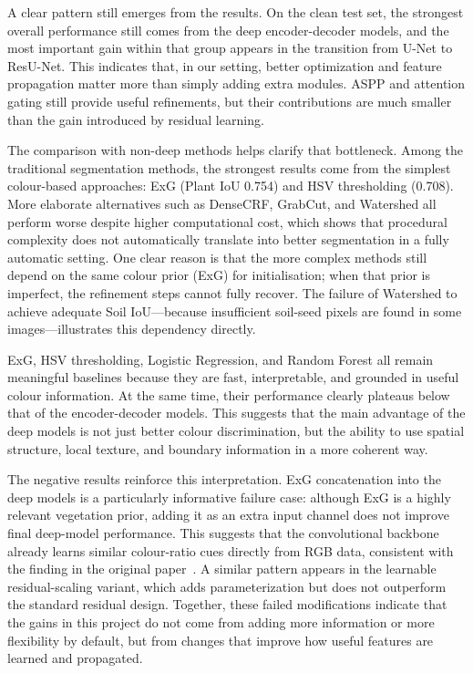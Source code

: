 \documentclass[conference]{IEEEtran}
\begin{document}
A clear pattern still emerges from the results. On the clean test set,
the strongest overall performance still comes from the deep
encoder-decoder models, and the most important gain within that group
appears in the transition from U-Net to ResU-Net. This indicates that,
in our setting, better optimization and feature propagation matter more
than simply adding extra modules. ASPP and attention gating still
provide useful refinements, but their contributions are much smaller
than the gain introduced by residual learning.

The comparison with non-deep methods helps clarify that bottleneck.
Among the traditional segmentation methods, the strongest results come
from the simplest colour-based approaches: ExG (Plant IoU 0.754) and
HSV thresholding (0.708). More elaborate alternatives such as DenseCRF,
GrabCut, and Watershed all perform worse despite higher computational
cost, which shows that procedural complexity does not automatically
translate into better segmentation in a fully automatic setting. One
clear reason is that the more complex methods still depend on the same
colour prior (ExG) for initialisation; when that prior is imperfect,
the refinement steps cannot fully recover. The failure of Watershed to
achieve adequate Soil IoU---because insufficient soil-seed pixels are
found in some images---illustrates this dependency directly.

ExG, HSV thresholding, Logistic Regression, and Random Forest all
remain meaningful baselines because they are fast, interpretable, and
grounded in useful colour information. At the same time, their
performance clearly plateaus below that of the encoder-decoder models.
This suggests that the main advantage of the deep models is not just
better colour discrimination, but the ability to use spatial structure,
local texture, and boundary information in a more coherent way.

The negative results reinforce this interpretation. ExG concatenation
into the deep models is a particularly informative failure case:
although ExG is a highly relevant vegetation prior, adding it as an
extra input channel does not improve final deep-model performance. This
suggests that the convolutional backbone already learns similar
colour-ratio cues directly from RGB data, consistent with the finding in
the original paper~\cite{zenkl2022}. A similar pattern appears in the
learnable residual-scaling variant, which adds parameterization but does
not outperform the standard residual design. Together, these failed
modifications indicate that the gains in this project do not come from
adding more information or more flexibility by default, but from changes
that improve how useful features are learned and propagated.
\end{document}
